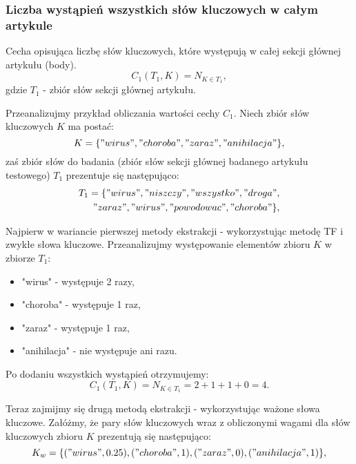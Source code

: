 \documentclass{classrep}
\begin{document}
\subsubsection{Liczba wystąpień wszystkich słów kluczowych w całym artykule}
Cecha opisująca liczbę słów kluczowych, które występują w całej sekcji głównej artykułu (body).
\begin{equation}
            C_{1}(T_{1},K) = N_{K \in T_{1}},
 \end{equation}	
 gdzie $T_{1}$ - zbiór słów sekcji głównej artykułu. \newline

Przeanalizujmy przykład obliczania wartości cechy $C_{1}$. Niech zbiór słów kluczowych $K$ ma postać:
\begin{equation}
K = \{{"wirus", "choroba", "zaraz", "anihilacja"}\},
 \end{equation}	
zaś zbiór słów do badania (zbiór słów sekcji głównej badanego artykułu testowego) $T_{1}$ prezentuje się następująco:
\begin{equation}
\begin{split}
T_{1} = \{{"wirus", "niszczy", "wszystko", "droga",}\\ 
{"zaraz", "wirus", "powodowac", "choroba"}\},
\end{split}
\end{equation}	

Najpierw w wariancie pierwszej metody ekstrakcji - wykorzystując metodę TF i zwykłe słowa kluczowe. Przeanalizujmy występowanie elementów zbioru $K$  w zbiorze $T_{1}$:
\begin{itemize}[label=$\bullet$\scshape\bfseries]
\item "wirus" - występuje 2 razy,
\item "choroba" - występuje 1 raz,
\item "zaraz" - występuje 1 raz,
\item "anihilacja" - nie występuje ani razu.
\end{itemize}

Po dodaniu wszystkich wystąpień otrzymujemy:
\begin{equation}
 C_{1}(T_{1},K) =  N_{K \in T_{1}} = 2+1+1+0= 4.
 \end{equation}	

Teraz zajmijmy się drugą metodą ekstrakcji - wykorzystując ważone słowa kluczowe. Załóżmy, że pary słów kluczowych wraz z obliczonymi wagami dla słów kluczowych zbioru $K$ prezentują się następująco:
\begin{equation}
K_{w} = \{{("wirus", 0.25), ("choroba", 1), ("zaraz", 0), ("anihilacja", 1)}\},
 \end{equation}	
\end{document}
